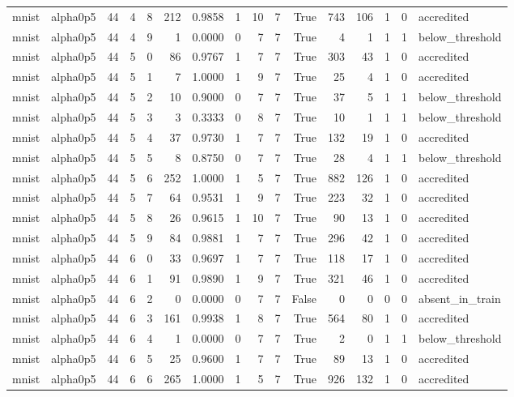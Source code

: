 \begin{tabular}{llrrrrrrrrrrrrrl}
mnist & alpha0p5 & 44 & 4 & 8 & 212 & 0.9858 & 1 & 10 & 7 & True & 743 & 106 & 1 & 0 & accredited \\
mnist & alpha0p5 & 44 & 4 & 9 & 1 & 0.0000 & 0 & 7 & 7 & True & 4 & 1 & 1 & 1 & below\_threshold \\
mnist & alpha0p5 & 44 & 5 & 0 & 86 & 0.9767 & 1 & 7 & 7 & True & 303 & 43 & 1 & 0 & accredited \\
mnist & alpha0p5 & 44 & 5 & 1 & 7 & 1.0000 & 1 & 9 & 7 & True & 25 & 4 & 1 & 0 & accredited \\
mnist & alpha0p5 & 44 & 5 & 2 & 10 & 0.9000 & 0 & 7 & 7 & True & 37 & 5 & 1 & 1 & below\_threshold \\
mnist & alpha0p5 & 44 & 5 & 3 & 3 & 0.3333 & 0 & 8 & 7 & True & 10 & 1 & 1 & 1 & below\_threshold \\
mnist & alpha0p5 & 44 & 5 & 4 & 37 & 0.9730 & 1 & 7 & 7 & True & 132 & 19 & 1 & 0 & accredited \\
mnist & alpha0p5 & 44 & 5 & 5 & 8 & 0.8750 & 0 & 7 & 7 & True & 28 & 4 & 1 & 1 & below\_threshold \\
mnist & alpha0p5 & 44 & 5 & 6 & 252 & 1.0000 & 1 & 5 & 7 & True & 882 & 126 & 1 & 0 & accredited \\
mnist & alpha0p5 & 44 & 5 & 7 & 64 & 0.9531 & 1 & 9 & 7 & True & 223 & 32 & 1 & 0 & accredited \\
mnist & alpha0p5 & 44 & 5 & 8 & 26 & 0.9615 & 1 & 10 & 7 & True & 90 & 13 & 1 & 0 & accredited \\
mnist & alpha0p5 & 44 & 5 & 9 & 84 & 0.9881 & 1 & 7 & 7 & True & 296 & 42 & 1 & 0 & accredited \\
mnist & alpha0p5 & 44 & 6 & 0 & 33 & 0.9697 & 1 & 7 & 7 & True & 118 & 17 & 1 & 0 & accredited \\
mnist & alpha0p5 & 44 & 6 & 1 & 91 & 0.9890 & 1 & 9 & 7 & True & 321 & 46 & 1 & 0 & accredited \\
mnist & alpha0p5 & 44 & 6 & 2 & 0 & 0.0000 & 0 & 7 & 7 & False & 0 & 0 & 0 & 0 & absent\_in\_train \\
mnist & alpha0p5 & 44 & 6 & 3 & 161 & 0.9938 & 1 & 8 & 7 & True & 564 & 80 & 1 & 0 & accredited \\
mnist & alpha0p5 & 44 & 6 & 4 & 1 & 0.0000 & 0 & 7 & 7 & True & 2 & 0 & 1 & 1 & below\_threshold \\
mnist & alpha0p5 & 44 & 6 & 5 & 25 & 0.9600 & 1 & 7 & 7 & True & 89 & 13 & 1 & 0 & accredited \\
mnist & alpha0p5 & 44 & 6 & 6 & 265 & 1.0000 & 1 & 5 & 7 & True & 926 & 132 & 1 & 0 & accredited \\

\end{tabular}
